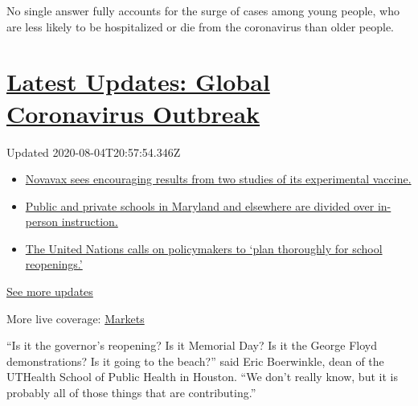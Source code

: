 No single answer fully accounts for the surge of cases among young
people, who are less likely to be hospitalized or die from the
coronavirus than older people.

\hypertarget{latest-updates-global-coronavirus-outbreak}{%
\section{\texorpdfstring{\href{https://www.nytimes.com/2020/08/04/world/coronavirus-cases.html?action=click\&pgtype=Article\&state=default\&region=MAIN_CONTENT_1\&context=storylines_live_updates}{Latest
Updates: Global Coronavirus
Outbreak}}{Latest Updates: Global Coronavirus Outbreak}}\label{latest-updates-global-coronavirus-outbreak}}

Updated 2020-08-04T20:57:54.346Z

\begin{itemize}
\tightlist
\item
  \href{https://www.nytimes.com/2020/08/04/world/coronavirus-cases.html?action=click\&pgtype=Article\&state=default\&region=MAIN_CONTENT_1\&context=storylines_live_updates\#link-1228a480}{Novavax
  sees encouraging results from two studies of its experimental
  vaccine.}
\item
  \href{https://www.nytimes.com/2020/08/04/world/coronavirus-cases.html?action=click\&pgtype=Article\&state=default\&region=MAIN_CONTENT_1\&context=storylines_live_updates\#link-4825b93}{Public
  and private schools in Maryland and elsewhere are divided over
  in-person instruction.}
\item
  \href{https://www.nytimes.com/2020/08/04/world/coronavirus-cases.html?action=click\&pgtype=Article\&state=default\&region=MAIN_CONTENT_1\&context=storylines_live_updates\#link-50f7386d}{The
  United Nations calls on policymakers to `plan thoroughly for school
  reopenings.'}
\end{itemize}

\href{https://www.nytimes.com/2020/08/04/world/coronavirus-cases.html?action=click\&pgtype=Article\&state=default\&region=MAIN_CONTENT_1\&context=storylines_live_updates}{See
more updates}

More live coverage:
\href{https://www.nytimes.com/live/2020/08/04/business/stock-market-today-coronavirus?action=click\&pgtype=Article\&state=default\&region=MAIN_CONTENT_1\&context=storylines_live_updates}{Markets}

``Is it the governor's reopening? Is it Memorial Day? Is it the George
Floyd demonstrations? Is it going to the beach?'' said Eric Boerwinkle,
dean of the UTHealth School of Public Health in Houston. ``We don't
really know, but it is probably all of those things that are
contributing.''

